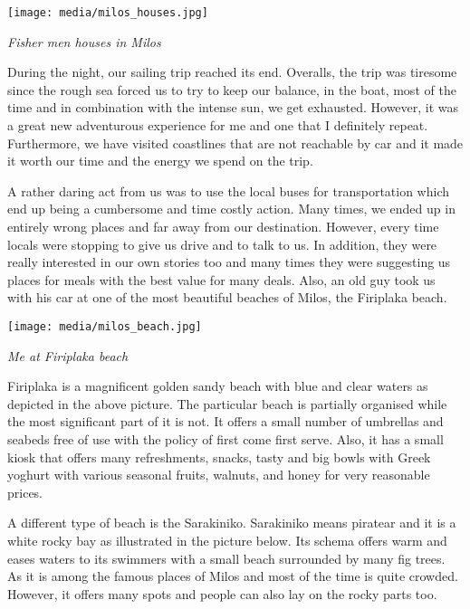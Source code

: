 \documentclass[10pt,a4paper]{article} %
\begin{document}
\begin{multicols}{3}
\begin{center}
	\texttt{[image: media/milos\_houses.jpg]}
	\par\textit{Fisher men houses in Milos}
\end{center}

During the night, our sailing trip reached its end. 
Overalls, the trip was tiresome since the rough sea forced us to try to keep
our balance, in the boat, most of the time and in combination with the intense sun, 
we get exhausted. 
However, it was a great new adventurous experience for me and one that 
I definitely repeat. 
Furthermore, we have visited coastlines that are not reachable by car and it 
made it worth our time and the energy we spend on the trip. 

A rather daring act from us was to use the local buses for transportation which 
end up being a cumbersome and time costly action. 
Many times, we ended up in entirely wrong places and far away from our 
destination. 
However, every time locals were stopping to give us drive and to talk to us. 
In addition, they were really interested in our own stories too and many times 
they were suggesting us places for meals with the best value for many deals. 
Also, an old guy took us with his car at one of the most beautiful beaches of 
Milos, the Firiplaka beach. 

\begin{center}
	\texttt{[image: media/milos\_beach.jpg]}
	\par\textit{Me at Firiplaka beach}
\end{center}

Firiplaka is a magnificent golden sandy beach with blue and clear waters 
as depicted in the above picture. 
The particular beach is partially organised while the most significant part of it is not. 
It offers a small number of umbrellas and seabeds free of use with the policy 
of first come first serve. 
Also, it has a small kiosk that offers many refreshments, snacks, tasty 
and big bowls with Greek yoghurt with various seasonal fruits, walnuts, and honey 
for very reasonable prices. 

A different type of beach is the Sarakiniko. 
Sarakiniko means piratear and it is a white rocky bay as illustrated in the 
picture below. 
Its schema offers warm and eases waters to its swimmers with a small beach surrounded 
by many fig trees. 
As it is among the famous places of Milos and most of the time is quite crowded. 
However, it offers many spots and people can also lay on the rocky parts too.


\end{multicols}
\end{document}
